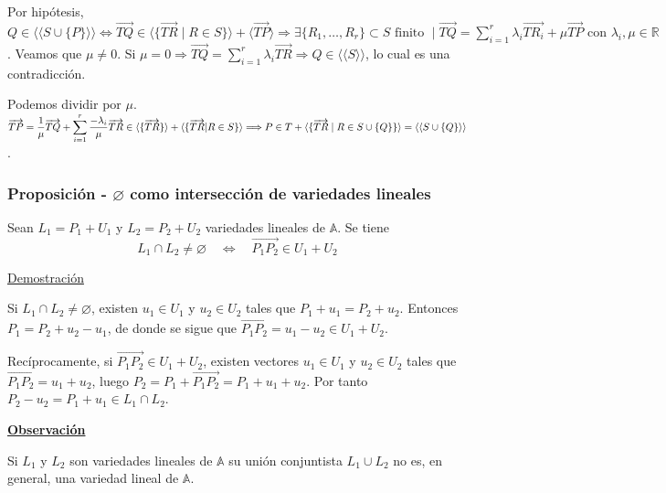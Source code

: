 \documentclass[12pt, a4paper, ones, notitlepage, openany,titlepage]{article}
\newcommand{\demostracion}{\noindent\underline{Demostración}}
\newcommand{\observacion}{\noindent\underline{\textbf{Observación}}}
\begin{document}
\begin{enumerate}[label=(\alph*)]
	Por hipótesis, $\displaystyle Q \in \langle\langle S \cup \{P\}\rangle\rangle \Longleftrightarrow \overrightarrow{TQ} \in \langle \{\overrightarrow{TR} \mid R \in S\} \rangle + \langle \overrightarrow{TP} \rangle \Longrightarrow \exists \{R_1,\ldots,R_r\} \subset S \text{ finito } \mid \overrightarrow{TQ} = \sum_{i = 1}^{r} \lambda_i \overrightarrow{TR_i} + \mu \overrightarrow{TP} \text{ con } \lambda_i, \mu \in \mathbb{R}$. Veamos que $\displaystyle \mu \neq 0$. Si $\displaystyle \mu = 0 \Longrightarrow \overrightarrow{TQ} = \sum_{i = 1}^{r} \lambda_i \overrightarrow{TR} \Longrightarrow Q \in \langle\langle S \rangle\rangle$, lo cual es una contradicción.
	
	Podemos dividir por $\mu$. $\displaystyle \overrightarrow{TP} = \frac{1}{\mu} \overrightarrow{TQ} + \sum_{i = 1}^{r} \frac{-\lambda_i}{\mu} \overrightarrow{TR} \in \langle \{\overrightarrow{TR}\} \rangle + \langle \{\overrightarrow{TR} | R \in S\} \rangle \Longrightarrow \\ P \in T + \langle \{\overrightarrow{TR} \mid R \in S \cup \{Q\}\} \rangle = \langle\langle S \cup \{Q\} \rangle\rangle$.
\end{enumerate}

\subsubsection{Proposición - $\varnothing$ como intersección de variedades lineales}
\noindent Sean $L_{1}=P_{1}+U_{1}$ y $L_{2}=P_{2}+U_{2}$ variedades lineales de $\mathbb{A}$. Se tiene
$$
L_{1} \cap L_{2} \neq \varnothing \quad \Longleftrightarrow \quad \overrightarrow{P_{1} P_{2}} \in U_{1}+U_{2}
$$

\demostracion

Si $L_{1} \cap L_{2} \neq \varnothing$, existen $u_{1} \in U_{1}$ y $u_{2} \in U_{2}$ tales que $P_{1}+u_{1}=P_{2}+u_{2}$. Entonces $P_{1}=P_{2}+u_{2}-u_{1}$, de donde se sigue que $\overrightarrow{P_{1} P_{2}}=u_{1}-u_{2} \in U_{1}+U_{2}$.

Recíprocamente, si $\overrightarrow{P_{1} P_{2}} \in U_{1}+U_{2}$, existen vectores $u_{1} \in U_{1}$ y $u_{2} \in U_{2}$ tales que $\overrightarrow{P_{1} P_{2}}=u_{1}+u_{2}$, luego $P_{2}=P_{1}+\overrightarrow{P_{1} P_{2}}=P_{1}+u_{1}+u_{2}$. Por tanto $P_{2}-u_{2}=P_{1}+u_{1} \in L_{1} \cap L_{2}$.

\observacion

Si $L_{1}$ y $L_{2}$ son variedades lineales de $\mathbb{A}$ su unión conjuntista $L_{1} \cup L_{2}$ no es, en general, una variedad lineal de $\mathbb{A}$.
\end{document}
